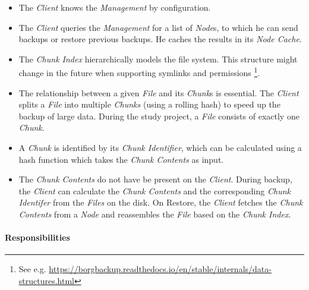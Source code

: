 \begin{itemize}
    \item The \emph{Client} knows the \emph{Management} by configuration.
    \item The \emph{Client} queries the \emph{Management} for a list of \emph{Node}s, to which he can send backups or restore previous backups. He caches the results in its \emph{Node Cache}.
    \item The \emph{Chunk Index} hierarchically models the file system. This structure might change in the future when supporting symlinks and permissions \footnote{See e.g. \url{https://borgbackup.readthedocs.io/en/stable/internals/data-structures.html}}.
    \item The relationship between a given \emph{File} and its \emph{Chunk}s is essential. The \emph{Client} splits a \emph{File} into multiple \emph{Chunks} (using a rolling hash) to speed up the backup of large data. During the study project, a \emph{File} consists of exactly one \emph{Chunk}.
    \item A \emph{Chunk} is identified by its \emph{Chunk Identifier}, which can be calculated using a hash function which takes the \emph{Chunk Contents}  as input.
    \item The \emph{Chunk Contents} do not have be present on the \emph{Client}. During backup, the \emph{Client} can calculate the \emph{Chunk Contents} and the corresponding \emph{Chunk Identifer} from the \emph{Files} on the disk. On Restore, the \emph{Client} fetches the \emph{Chunk Contents} from a \emph{Node} and reassembles the \emph{File} based on the \emph{Chunk Index}.
\end{itemize}


\paragraph{Responsibilities}


